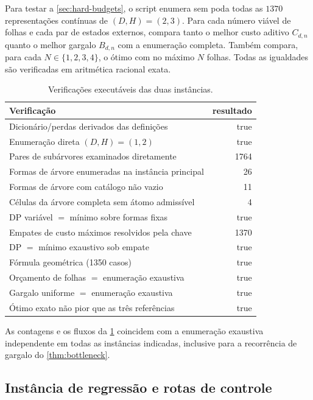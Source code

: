 \documentclass[11pt,a4paper]{article}
\theoremstyle{definition}
\theoremstyle{remark}
\begin{document}
Para testar a \cref{sec:hard-budgets}, o script enumera sem poda todas as
$1370$ representações contínuas de $(D,H)=(2,3)$. Para cada número viável de
folhas e cada par de estados externos, compara tanto o melhor custo aditivo
$C_{d,n}$ quanto o melhor gargalo $B_{d,n}$ com a enumeração completa. Também
compara, para cada $N\in\{1,2,3,4\}$, o ótimo com no máximo $N$ folhas. Todas
as igualdades são verificadas em aritmética racional exata.

\begin{table}[t]
 \centering
 \caption{Verificações executáveis das duas instâncias.}
 \label{tab:dp-audit}
 \small
 \begin{tabularx}{\linewidth}{@{}Xr@{}}
\toprule
Verificação & resultado \\
\midrule
Dicionário/perdas derivados das definições & true \\
Enumeração direta $(D,H)=(1,2)$ & true \\
Pares de subárvores examinados diretamente & 1764 \\
Formas de árvore enumeradas na instância principal & 26 \\
Formas de árvore com catálogo não vazio & 11 \\
Células da árvore completa sem átomo admissível & 4 \\
DP variável $=$ mínimo sobre formas fixas & true \\
Empates de custo máximos resolvidos pela chave & 1370 \\
DP $=$ mínimo exaustivo sob empate & true \\
Fórmula geométrica (1350 casos) & true \\
Orçamento de folhas $=$ enumeração exaustiva & true \\
Gargalo uniforme $=$ enumeração exaustiva & true \\
Ótimo exato não pior que as três referências & true \\
\bottomrule
\end{tabularx}

\end{table}

As contagens e os fluxos da \cref{tab:dp-audit} coincidem com a enumeração
exaustiva independente em todas as instâncias indicadas, inclusive para a
recorrência de gargalo do \cref{thm:bottleneck}.

\subsection{Instância de regressão e rotas de controle}
\end{document}

